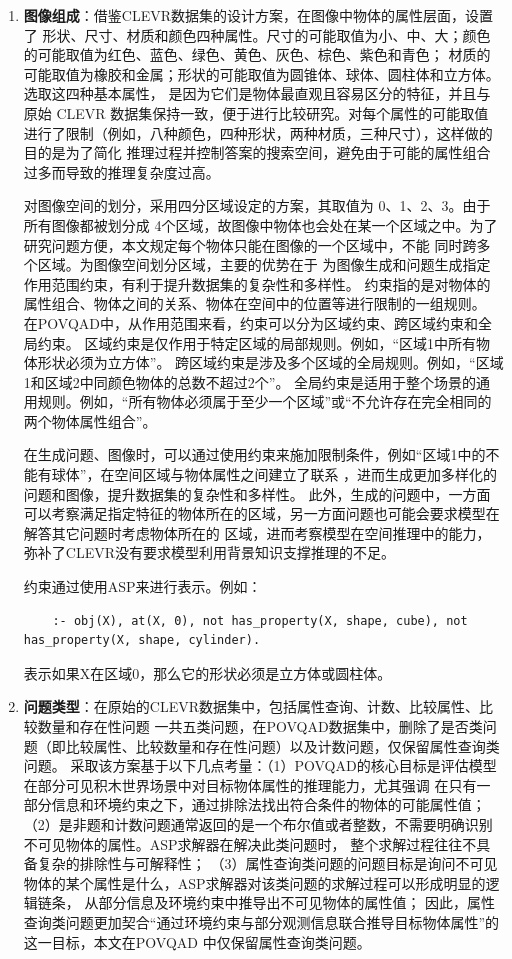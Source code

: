 \begin{enumerate}[nosep]
\item \textbf{图像组成}：借鉴CLEVR数据集的设计方案，在图像中物体的属性层面，设置了
形状、尺寸、材质和颜色四种属性。尺寸的可能取值为小、中、大；颜色的可能取值为红色、蓝色、绿色、黄色、灰色、棕色、紫色和青色；
材质的可能取值为橡胶和金属；形状的可能取值为圆锥体、球体、圆柱体和立方体。选取这四种基本属性，
是因为它们是物体最直观且容易区分的特征，并且与原始 CLEVR 数据集保持一致，便于进行比较研究。对每个属性的可能取值
进行了限制（例如，八种颜色，四种形状，两种材质，三种尺寸），这样做的目的是为了简化
推理过程并控制答案的搜索空间，避免由于可能的属性组合过多而导致的推理复杂度过高。

对图像空间的划分，采用四分区域设定的方案，其取值为 0、1、2、3。由于所有图像都被划分成
4个区域，故图像中物体也会处在某一个区域之中。为了研究问题方便，本文规定每个物体只能在图像的一个区域中，不能
同时跨多个区域。为图像空间划分区域，主要的优势在于
为图像生成和问题生成指定作用范围约束，有利于提升数据集的复杂性和多样性。
约束指的是对物体的属性组合、物体之间的关系、物体在空间中的位置等进行限制的一组规则。
在POVQAD中，从作用范围来看，约束可以分为区域约束、跨区域约束和全局约束。
区域约束是仅作用于特定区域的局部规则。例如，“区域1中所有物体形状必须为立方体”。
跨区域约束是涉及多个区域的全局规则。例如，“区域1和区域2中同颜色物体的总数不超过2个”。
全局约束是适用于整个场景的通用规则。例如，“所有物体必须属于至少一个区域”或“不允许存在完全相同的两个物体属性组合”。

在生成问题、图像时，可以通过使用约束来施加限制条件，例如“区域1中的不能有球体”，在空间区域与物体属性之间建立了联系
，进而生成更加多样化的问题和图像，提升数据集的复杂性和多样性。
此外，生成的问题中，一方面可以考察满足指定特征的物体所在的区域，另一方面问题也可能会要求模型在解答其它问题时考虑物体所在的
区域，进而考察模型在空间推理中的能力，弥补了CLEVR没有要求模型利用背景知识支撑推理的不足。

约束通过使用ASP来进行表示。例如：
\begin{lstlisting}
    :- obj(X), at(X, 0), not has_property(X, shape, cube), not has_property(X, shape, cylinder).
\end{lstlisting}
表示如果X在区域0，那么它的形状必须是立方体或圆柱体。
\item \textbf{问题类型}：在原始的CLEVR数据集中，包括属性查询、计数、比较属性、比较数量和存在性问题
一共五类问题，在POVQAD数据集中，删除了是否类问题（即比较属性、比较数量和存在性问题）以及计数问题，仅保留属性查询类问题。
采取该方案基于以下几点考量：（1）POVQAD的核心目标是评估模型在部分可见积木世界场景中对目标物体属性的推理能力，尤其强调
在只有一部分信息和环境约束之下，通过排除法找出符合条件的物体的可能属性值；
（2）是非题和计数问题通常返回的是一个布尔值或者整数，不需要明确识别不可见物体的属性。ASP求解器在解决此类问题时，
整个求解过程往往不具备复杂的排除性与可解释性；
（3）属性查询类问题的问题目标是询问不可见物体的某个属性是什么，ASP求解器对该类问题的求解过程可以形成明显的逻辑链条，
从部分信息及环境约束中推导出不可见物体的属性值；
因此，属性查询类问题更加契合“通过环境约束与部分观测信息联合推导目标物体属性”的这一目标，本文在POVQAD
中仅保留属性查询类问题。


\end{enumerate}
